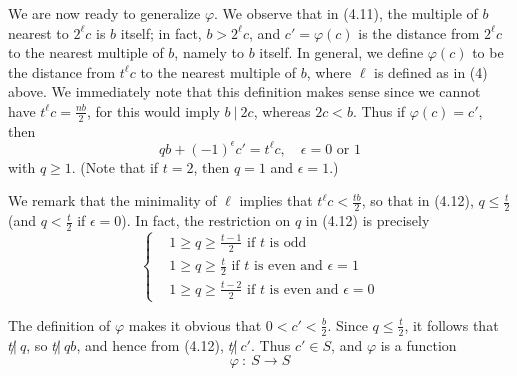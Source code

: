 We are now ready to generalize $\varphi$. We observe that in (4.11), the multiple of $b$ nearest to $2^{\ell} c$ is $b$ itself; in fact, $b > 2^{\ell} c$, and $c' = \varphi(c)$ is the distance from $2^{\ell} c$ to the nearest multiple of $b$, namely to $b$ itself. In general, we define $\varphi(c)$ to be the distance from $t^{\ell} c$ to the nearest multiple of $b$, where $\ell$ is defined as in (4) above. We immediately note that this definition makes sense since we cannot have $t^{\ell} c = \frac{nb}{2}$, for this would imply $b\ |\ 2c$, whereas $2c < b$. Thus if $\varphi(c) = c'$, then
\begin{equation}
qb + (-1)^{\epsilon} c' = t^{\ell} c, \quad \epsilon = 0 \text{ or } 1  \tag{4.12}
\end{equation}
with $q \geq 1$. (Note that if $t = 2$, then $q = 1$ and $\epsilon = 1$.)

We remark that the minimality of $\ell$ implies that $t^{\ell} c < \frac{tb}{2}$, so that in (4.12), $q \leq \frac{t}{2}$ (and $q < \frac{t}{2}$ if $\epsilon = 0$). In fact, the restriction on $q$ in (4.12) is precisely
\begin{equation}
\begin{cases}
& 1 \geq q \geq \frac{t-1}{2} \text{ if $t$ is odd} \\
& 1 \geq q \geq \frac{t}{2} \text{ if $t$ is even and $\epsilon = 1$} \\
& 1 \geq q \geq \frac{t-2}{2} \text{ if $t$ is even and $\epsilon = 0$}
\end{cases}  \tag{4.13}
\end{equation}

The definition of $\varphi$ makes it obvious that $0 < c' < \frac{b}{2}$. Since $q \leq \frac{t}{2}$, it follows that $t \not|\ q$, so $t \not|\ qb$, and hence from (4.12), $t \not|\ c'$. Thus $c' \in S$, and $\varphi$ is a function
\begin{equation*}
\varphi\ :\ S \to S
\end{equation*}

